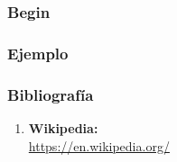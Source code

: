 \documentclass[10pt]{beamer}
\title{}
\subtitle{Ejemplo: openMP}
\date{}
\author{Luis María Costero Valero\\Jesús Javier Domenech Arellano\\Hristo
  Ivanov Ivanov}
\institute{11 Enero 2016}
\begin{document}
\maketitle







\begin{frame}
  \frametitle{Begin}
\end{frame}


\begin{frame}
  \frametitle{Ejemplo}
\end{frame}

\begin{frame}
  \frametitle{Bibliografía}
  
  \begin{enumerate}
  \item \textbf{Wikipedia:}\\\url{https://en.wikipedia.org/}
  \end{enumerate}
\end{frame}
\end{document}
